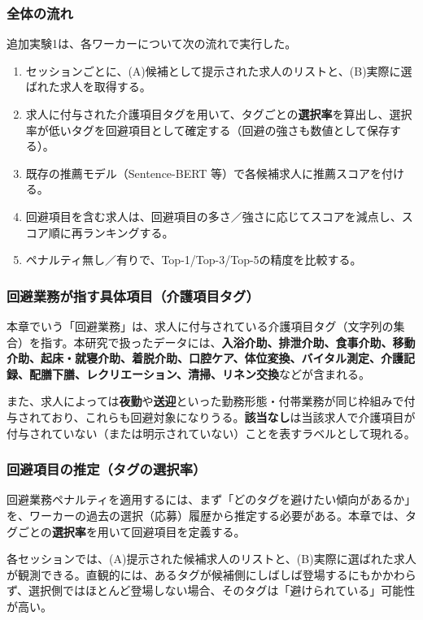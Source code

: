 \subsubsection*{全体の流れ}
追加実験1は、各ワーカーについて次の流れで実行した。
\begin{enumerate}
\item セッションごとに、(A)候補として提示された求人のリストと、(B)実際に選ばれた求人を取得する。
\item 求人に付与された介護項目タグを用いて、タグごとの\textbf{選択率}を算出し、選択率が低いタグを回避項目として確定する（回避の強さも数値として保存する）。
\item 既存の推薦モデル（Sentence-BERT 等）で各候補求人に推薦スコアを付ける。
\item 回避項目を含む求人は、回避項目の多さ／強さに応じてスコアを減点し、スコア順に再ランキングする。
\item ペナルティ無し／有りで、Top-1/Top-3/Top-5の精度を比較する。
\end{enumerate}

\subsubsection*{回避業務が指す具体項目（介護項目タグ）}
本章でいう「回避業務」は、求人に付与されている介護項目タグ（文字列の集合）を指す。本研究で扱ったデータには、\textbf{入浴介助、排泄介助、食事介助、移動介助、起床・就寝介助、着脱介助、口腔ケア、体位変換、バイタル測定、介護記録、配膳下膳、レクリエーション、清掃、リネン交換}などが含まれる。

また、求人によっては\textbf{夜勤}や\textbf{送迎}といった勤務形態・付帯業務が同じ枠組みで付与されており、これらも回避対象になりうる。\textbf{該当なし}は当該求人で介護項目が付与されていない（または明示されていない）ことを表すラベルとして現れる。

\subsubsection*{回避項目の推定（タグの選択率）}
回避業務ペナルティを適用するには、まず「どのタグを避けたい傾向があるか」を、ワーカーの過去の選択（応募）履歴から推定する必要がある。本章では、タグごとの\textbf{選択率}を用いて回避項目を定義する。

各セッションでは、(A)提示された候補求人のリストと、(B)実際に選ばれた求人が観測できる。直観的には、あるタグが候補側にしばしば登場するにもかかわらず、選択側ではほとんど登場しない場合、そのタグは「避けられている」可能性が高い。

